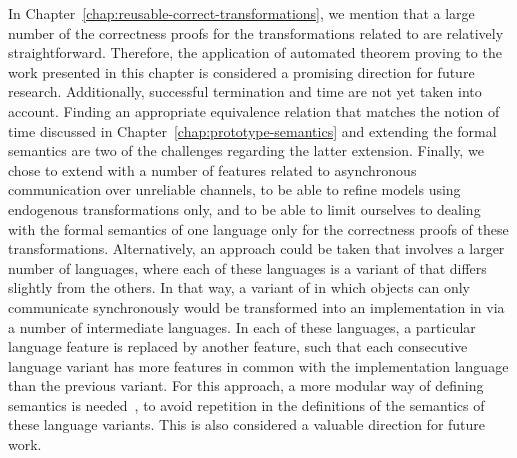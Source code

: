 

In Chapter~\ref{chap:reusable-correct-transformations}, we mention that a large number of the correctness proofs for the transformations related to \SLCO are relatively straightforward.
Therefore, the application of automated theorem proving to the work presented in this chapter is considered a promising direction for future research.
Additionally, successful termination and time are not yet taken into account.
Finding an appropriate equivalence relation that matches the notion of time discussed in Chapter~\ref{chap:prototype-semantics} and extending the formal semantics are two of the challenges regarding the latter extension.
Finally, we chose to extend \SLCO with a number of features related to asynchronous communication over unreliable channels, to be able to refine models using endogenous transformations only, and to be able to limit ourselves to dealing with the formal semantics of one language only for the correctness proofs of these transformations.
Alternatively, an approach could be taken that involves a larger number of languages, where each of these languages is a variant of \SLCO that differs slightly from the others.
In that way, a variant of \SLCO in which objects can only communicate synchronously would be transformed into an implementation in \NQC via a number of intermediate languages.
In each of these languages, a particular language feature is replaced by another feature, such that each consecutive language variant has more features in common with the implementation language than the previous variant.
For this approach, a more modular way of defining semantics is needed~\cite{Mosses:2009:CS:1596486.1596489, Johnstone2010AAL}, to avoid repetition in the definitions of the semantics of these language variants.
This is also considered a valuable direction for future work.


